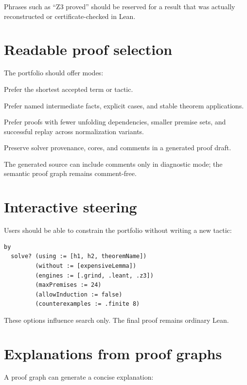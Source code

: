 \documentclass[11pt,letterpaper,openany]{report}
\begin{document}
Phrases such as ``Z3 proved'' should be reserved for a result that was actually
reconstructed or certificate-checked in Lean.

\section{Readable proof selection}

The portfolio should offer modes:

\begin{description}[style=nextline,leftmargin=1.8em]
  \item[Compact] Prefer the shortest accepted term or tactic.
  \item[Readable] Prefer named intermediate facts, explicit cases, and stable theorem
        applications.
  \item[Robust] Prefer proofs with fewer unfolding dependencies, smaller premise sets,
        and successful replay across normalization variants.
  \item[Diagnostic] Preserve solver provenance, cores, and comments in a generated
        proof draft.
\end{description}

The generated source can include comments only in diagnostic mode; the semantic proof
graph remains comment-free.

\section{Interactive steering}

Users should be able to constrain the portfolio without writing a new tactic:

\begin{lstlisting}[language=LeanFour,caption={Illustrative steering options}]
by
  solve? (using := [h1, h2, theoremName])
         (without := [expensiveLemma])
         (engines := [.grind, .leant, .z3])
         (maxPremises := 24)
         (allowInduction := false)
         (counterexamples := .finite 8)
\end{lstlisting}

These options influence search only. The final proof remains ordinary Lean.

\section{Explanations from proof graphs}

A proof graph can generate a concise explanation:
\end{document}
